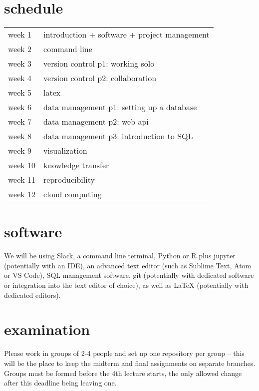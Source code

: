 \documentclass[12pt]{article}
\begin{document}

\section{schedule} %
\label{sec:schedule}

\begin{tabularx}{0.7\textwidth}{Xl}
    week 1 & introduction + software + project management \\
    week 2 & command line \\
    week 3 & version control p1: working solo \\
    week 4 & version control p2: collaboration \\
    week 5 & latex \\
    week 6 & data management p1: setting up a database \\
    week 7 & data management p2: web api \\
    week 8 & data management p3: introduction to SQL \\
    week 9 & visualization \\
    week 10 & knowledge transfer \\
    week 11 & reproducibility \\
    week 12 & cloud computing
\end{tabularx}


\section{software} %
\label{sec:software}
We will be using Slack, a command line terminal, Python or R plus jupyter (potentially with an IDE), an advanced text editor (such as Sublime Text, Atom or VS Code), SQL management software, git (potentially with dedicated software or integration into the text editor of choice), as well as LaTeX (potentially with dedicated editors).


\newpage
\section{examination} %
\label{sec:examination}

Please work in groups of 2-4 people and set up one repository per group -- this will be the place to keep the midterm and final assignments on separate branches. Groups must be formed before the 4th lecture starts, the only allowed change after this deadline being leaving one.
\end{document}

